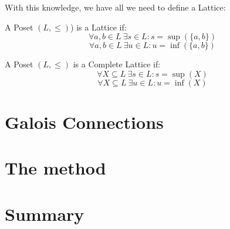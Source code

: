 With this knowledge, we have all we need to define a Lattice:
\begin{defn}[Lattice]
    A Poset $(L, \leq)$) is a Lattice if:
    \[\forall a, b \in L \: \exists s \in L: s = \sup(\{a,b\})\]
    \[\forall a, b \in L \: \exists u \in L: u = \inf(\{a,b\})\]
\end{defn}


\begin{defn}
    A Poset $(L, \leq)$ is a Complete Lattice if:
    \[\forall X \subseteq L \: \exists s \in L: s = \sup(X)\]
    \[\forall X \subseteq L \: \exists u \in L: u = \inf(X)\]
\end{defn}





\section{Galois Connections} %



\section{The method} %


\section*{Summary}
